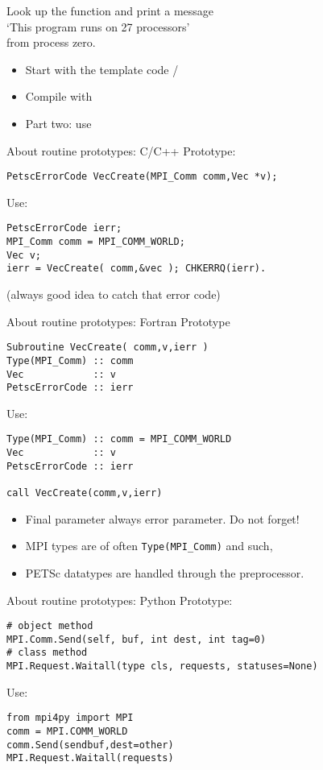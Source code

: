 \begin{exerciseframe}[hello]
Look up the function  and print a message\\
`This program runs on 27 processors'\\
from process zero.

\begin{itemize}
\item Start with the template code /
\item Compile with 
\item Part two: use 
\end{itemize}
\end{exerciseframe}


\begin{frame}[containsverbatim]{About routine prototypes: C/C++}
  \label{sec:protos}
Prototype:
\begin{verbatim}
PetscErrorCode VecCreate(MPI_Comm comm,Vec *v);
\end{verbatim}
Use:
\begin{verbatim}
PetscErrorCode ierr;
MPI_Comm comm = MPI_COMM_WORLD;
Vec v;
ierr = VecCreate( comm,&vec ); CHKERRQ(ierr).
\end{verbatim}
(always good idea to catch that error code)
\end{frame}

\lstset{language=Fortran}
\begin{frame}[containsverbatim]{About routine prototypes: Fortran}
Prototype
\begin{verbatim}
Subroutine VecCreate( comm,v,ierr )
Type(MPI_Comm) :: comm
Vec            :: v
PetscErrorCode :: ierr
\end{verbatim}
Use:
\begin{verbatim}
Type(MPI_Comm) :: comm = MPI_COMM_WORLD
Vec            :: v
PetscErrorCode :: ierr

call VecCreate(comm,v,ierr)
\end{verbatim}
\begin{itemize}
\item Final parameter always error parameter. Do not forget!
\item MPI types are of often \lstinline{Type(MPI_Comm)} and such,
\item PETSc datatypes are handled through the preprocessor.
\end{itemize}
\end{frame}

\lstset{language=Python}
\begin{frame}[containsverbatim]{About routine prototypes: Python}
Prototype:
\begin{verbatim}
# object method
MPI.Comm.Send(self, buf, int dest, int tag=0)
# class method
MPI.Request.Waitall(type cls, requests, statuses=None)
\end{verbatim}
Use:
\begin{verbatim}
from mpi4py import MPI
comm = MPI.COMM_WORLD
comm.Send(sendbuf,dest=other)
MPI.Request.Waitall(requests)
\end{verbatim}
\end{frame}


